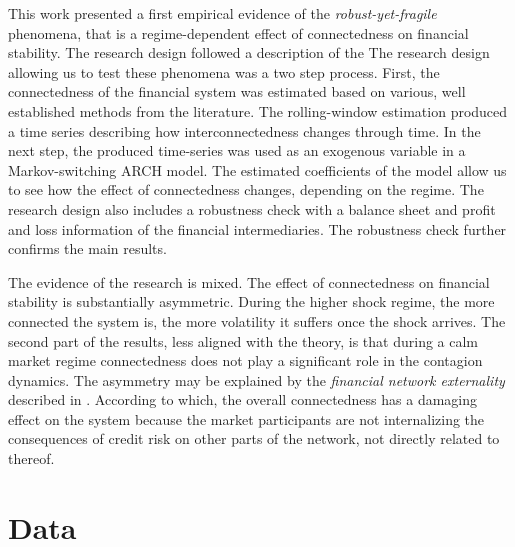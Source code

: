 \documentclass[12pt]{article}
\begin{document}
This work presented a first empirical evidence of the \textit{robust-yet-fragile} phenomena, that is a regime-dependent effect of connectedness on financial stability. The research design followed a description of the  The research design allowing us to test these phenomena was a two step process. First, the connectedness of the financial system was estimated based on various, well established methods from the literature. The rolling-window estimation produced a time series describing how interconnectedness changes through time. In the next step, the produced time-series was used as an exogenous variable in a Markov-switching ARCH model. The estimated coefficients of the model allow us to see how the effect of connectedness changes, depending on the regime. The research design also includes a robustness check with a balance sheet and profit and loss information of the financial intermediaries. The robustness check further confirms the main results.

The evidence of the research is mixed. The effect of connectedness on financial stability is substantially asymmetric. During the higher shock regime, the more connected the system is, the more volatility it suffers once the shock arrives. The second part of the results, less aligned with the theory, is that during a calm market regime connectedness does not play a significant role in the contagion dynamics. The asymmetry may be explained by the \textit{financial network externality} described in \citet{acemoglu15}. According to which, the overall connectedness has a damaging effect on the system because the market participants are not internalizing the consequences of credit risk on other parts of the network, not directly related to thereof.



\newpage

\appendix

\section{Data}\label{appendix:data}
\end{document}
